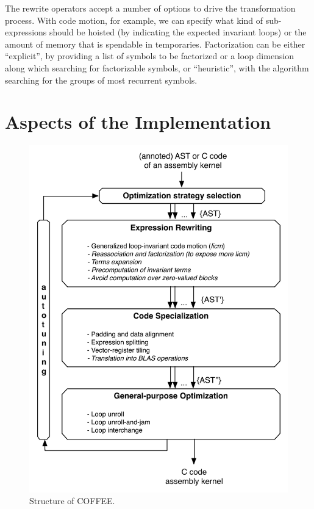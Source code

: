 The rewrite operators accept a number of options to drive the transformation process. With code motion, for example, we can specify what kind of sub-expressions should be hoisted (by indicating the expected invariant loops) or the amount of memory that is spendable in temporaries. Factorization can be either ``explicit'', by providing a list of symbols to be factorized or a loop dimension along which searching for factorizable symbols, or ``heuristic'', with the algorithm searching for the groups of most recurrent symbols.

\section{Aspects of the Implementation}

\begin{figure}
\begin{center}
\includegraphics[scale=0.70]{coffee/pictures/coffee-scheme.pdf}
\caption{Structure of COFFEE.}
\label{fig:coffee-compiler-structure}
\end{center}
\end{figure}

